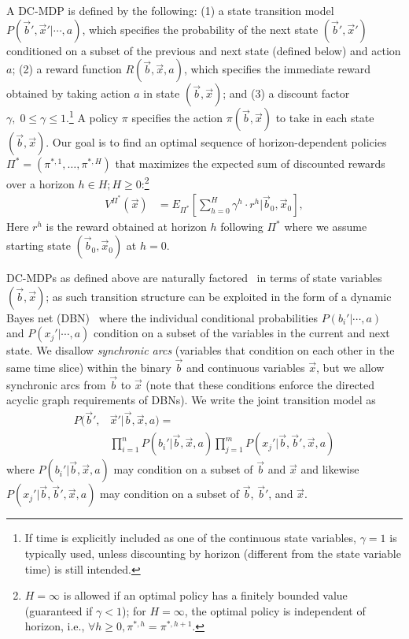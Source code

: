 \documentclass[letterpaper]{article}
\begin{document}
A DC-MDP is defined by the following: (1) a state transition model
$P(\vec{b}',\vec{x}'|\cdots,a)$, which specifies the probability of
the next state $(\vec{b}',\vec{x}')$ conditioned on a subset of the
previous and next state (defined below) and action $a$; (2) a reward
function $R(\vec{b},\vec{x},a)$, which specifies the immediate reward
obtained by taking action $a$ in state $(\vec{b},\vec{x})$; and (3) a
discount factor $\gamma, \; 0 \leq \gamma \leq 1$.\footnote{If time is
explicitly included as one of the continuous state variables, $\gamma
= 1$ is typically used, unless discounting by horizon (different from
the state variable time) is still intended.}  
A policy $\pi$
specifies the action $\pi(\vec{b},\vec{x})$ to take in each state
$(\vec{b},\vec{x})$.  Our goal is to find an optimal sequence of
horizon-dependent policies $\Pi^* = (\pi^{*,1},\ldots,\pi^{*,H})$
that maximizes the expected sum of discounted rewards over a horizon
$h \in H; H \geq 0$:\footnote{$H=\infty$ is allowed if an optimal policy has a
finitely bounded value (guaranteed if $\gamma < 1$); for $H=\infty$, 
the optimal policy is independent of horizon, 
i.e., $\forall h \geq 0, \pi^{*,h} = \pi^{*,h+1}$.}
\begin{align}
V^{\Pi^*}(\vec{x}) & = E_{\Pi^*} \left[ \sum_{h=0}^{H} \gamma^h \cdot r^h \Big| \vec{b}_0,\vec{x}_0 \right], \label{eq:vfun_def}
\end{align}
Here $r^h$ is the reward obtained at horizon $h$ following $\Pi^*$ where 
we assume starting state $(\vec{b}_0,\vec{x}_0)$ at $h=0$.
 
DC-MDPs as defined above are naturally factored~\cite{boutilier99dt}
in terms of state variables $(\vec{b},\vec{x})$; as such transition
structure can be exploited in the form of a dynamic Bayes net
(DBN)~\cite{dbn} where the individual conditional probabilities
$P(b_i'|\cdots,a)$ and $P(x_j'|\cdots,a)$ condition on a subset of the
variables in the current and next state.  We disallow \emph{synchronic
arcs} (variables that condition on each other in the same time slice) 
within the binary $\vec{b}$ and continuous variables $\vec{x}$, 
but we allow synchronic arcs from $\vec{b}$ to $\vec{x}$ (note that
these conditions enforce the directed acyclic graph requirements of
DBNs).
We write the joint transition model as
\begin{align}
P(\vec{b}',&\vec{x}'|\vec{b},\vec{x},a) = \label{eq:dbn} \\
& \prod_{i=1}^n P(b_i'|\vec{b},\vec{x},a) \prod_{j=1}^m P(x_j'|\vec{b},\vec{b}',\vec{x},a) \nonumber 
\end{align}
where $P(b_i'|\vec{b},\vec{x},a)$ may condition on a subset of
$\vec{b}$ and $\vec{x}$ and likewise 
$P(x_j'|\vec{b},\vec{b}',\vec{x},a)$ may condition on a subset of
$\vec{b}$, $\vec{b}'$, and $\vec{x}$.
\end{document}
